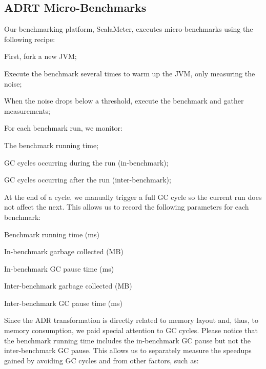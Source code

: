 \subsection{ADRT Micro-Benchmarks}

Our benchmarking platform, ScalaMeter, executes micro-benchmarks using the following recipe:
\begin{compactitem}
  \item First, fork a new JVM;
  \item Execute the benchmark several times to warm up the JVM, only measuring the noise;
  \item When the noise drops below a threshold, execute the benchmark and gather measurements;
\end{compactitem}

\vspace{0.5em}
\noindent
For each benchmark run, we monitor:
\begin{compactitem}
  \item The benchmark running time;
  \item GC cycles occurring during the run (in-benchmark);
  \item GC cycles occurring after the run (inter-benchmark);
\end{compactitem}

\vspace{0.5em}
\noindent
At the end of a cycle, we manually trigger a full GC cycle so the current run does not affect the next. This allows us to record the following parameters for each benchmark:

\begin{compactitem}
  \item Benchmark running time (ms)
  \item In-benchmark garbage collected (MB)
  \item In-benchmark GC pause time (ms)
  \item Inter-benchmark garbage collected (MB)
  \item Inter-benchmark GC pause time (ms)
\end{compactitem}

\vspace{0.5em}
\noindent
Since the ADR transformation is directly related to memory layout and, thus, to memory consumption, we paid special attention to GC cycles. Please notice that the benchmark running time includes the in-benchmark GC pause but not the inter-benchmark GC pause. This allows us to separately measure the speedups gained by avoiding GC cycles and from other factors, such as:

